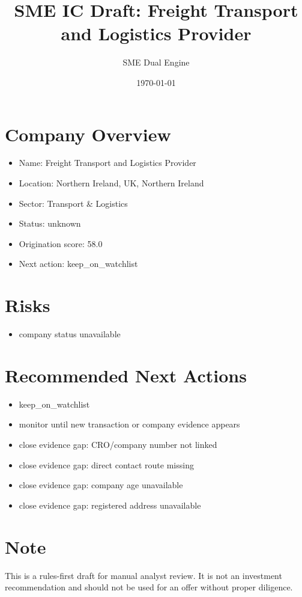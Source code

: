 \documentclass[11pt,a4paper]{article}
\title{SME IC Draft: Freight Transport and Logistics Provider}
\author{SME Dual Engine}
\date{\today}
\begin{document}
\maketitle
\section*{Company Overview}
\begin{itemize}[leftmargin=1.4em]
\item Name: Freight Transport and Logistics Provider
\item Location: Northern Ireland, UK, Northern Ireland
\item Sector: Transport \& Logistics
\item Status: unknown
\item Origination score: 58.0
\item Next action: keep\_on\_watchlist
\end{itemize}
\section*{Risks}
\begin{itemize}[leftmargin=1.4em]
\item company status unavailable
\end{itemize}
\section*{Recommended Next Actions}
\begin{itemize}[leftmargin=1.4em]
\item keep\_on\_watchlist
\item monitor until new transaction or company evidence appears
\item close evidence gap: CRO/company number not linked
\item close evidence gap: direct contact route missing
\item close evidence gap: company age unavailable
\item close evidence gap: registered address unavailable
\end{itemize}
\section*{Note}
This is a rules-first draft for manual analyst review. It is not an investment
recommendation and should not be used for an offer without proper diligence.
\end{document}
